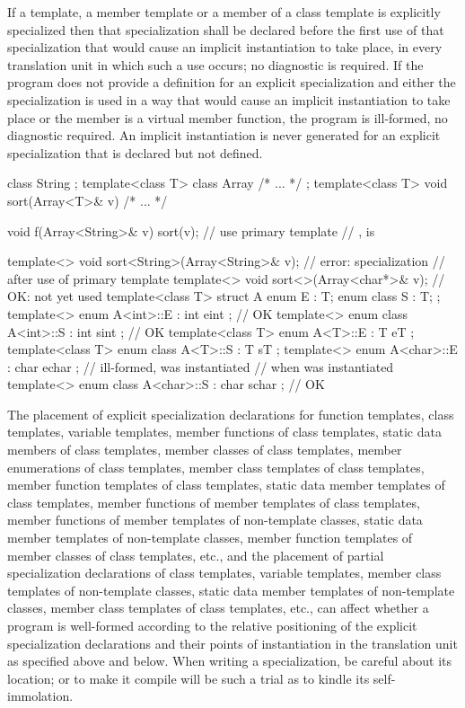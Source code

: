 \pnum
If a template, a member template or a member of a class template is explicitly
specialized then that specialization shall be declared before the first use of
that specialization that would cause an implicit instantiation to take place,
in every translation unit in which such a use occurs;
no diagnostic is required.
If the program does not provide a definition for an explicit specialization and
either the specialization is used in a way that would cause an implicit
instantiation to take place or the member is a virtual member function,
the program is ill-formed, no diagnostic required.
An implicit instantiation is never generated for an explicit specialization
that is declared but not defined.
\enterexample

\begin{codeblock}
class String { };
template<class T> class Array { /* ... */ };
template<class T> void sort(Array<T>& v) { /* ... */ }

void f(Array<String>& v) {
  sort(v);          // use primary template
                    // ,  is 
}

template<> void sort<String>(Array<String>& v); // error: specialization
                                                // after use of primary template
template<> void sort<>(Array<char*>& v);        // OK:  not yet used
template<class T> struct A {
  enum E : T;
  enum class S : T;
};
template<> enum A<int>::E : int { eint };         // OK
template<> enum class A<int>::S : int { sint };   // OK
template<class T> enum A<T>::E : T { eT };
template<class T> enum class A<T>::S : T { sT };
template<> enum A<char>::E : char { echar };       // ill-formed,  was instantiated
                                                   // when  was instantiated
template<> enum class A<char>::S : char { schar }; // OK
\end{codeblock}
\exitexample

\pnum
The placement of explicit specialization declarations for function templates, class
templates, variable templates,
member functions of class templates, static data members of class
templates, member classes of class templates, member enumerations of class
templates, member class templates of class
templates, member function templates of class templates,
static data member templates of class templates,
member functions of
member templates of class templates, member functions of member templates of
non-template classes,
static data member templates of non-template classes,
member function templates of member classes of class
templates, etc., and the placement of partial specialization declarations
of class templates, variable templates,
member class templates of non-template classes,
static data member templates of non-template classes, member
class templates of class templates, etc., can affect whether a program is
well-formed according to the relative positioning of the explicit specialization
declarations and their points of instantiation in the translation unit as
specified above and below.
%
When writing a specialization, be careful about its location;
or to make it compile will be such a trial as to kindle its self-immolation.

